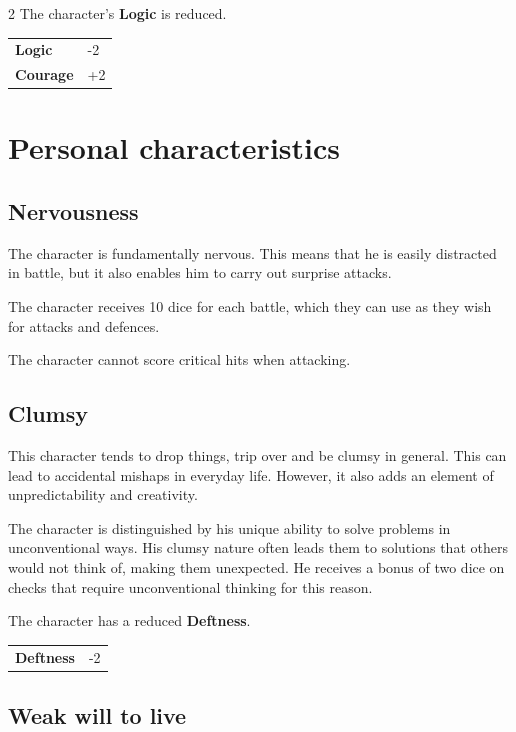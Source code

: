 \begin{multicols}{2}
    The character's \textbf{Logic} is reduced.

    \begin{tabular}{@{}ll@{}}
        \textbf{Logic} & -2\\
        \textbf{Courage} & +2\\
    \end{tabular}

    \section{Personal characteristics}

    \subsection*{Nervousness}

    The character is fundamentally nervous. This means that he is easily distracted in battle, but it also enables him to carry out surprise attacks.

    The character receives 10 dice for each battle, which they can use as they wish for attacks and defences.

    The character cannot score critical hits when attacking.


    \subsection*{Clumsy}

    This character tends to drop things, trip over and be clumsy in general. This can lead to accidental mishaps in everyday life. However, it also adds an element of unpredictability and creativity.

    The character is distinguished by his unique ability to solve problems in unconventional ways. His clumsy nature often leads them to solutions that others would not think of, making them unexpected. He receives a bonus of two dice on checks that require unconventional thinking for this reason.

    The character has a reduced \textbf{Deftness}.

    \begin{tabular}{@{}ll@{}}
        \textbf{Deftness} & -2\\
    \end{tabular}

    \subsection*{Weak will to live}


\end{multicols}

